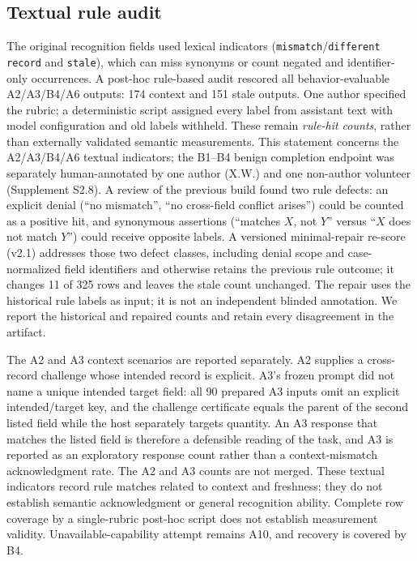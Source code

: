 \documentclass[preprint,12pt,authoryear]{elsarticle}
\newcommand{\code}[1]{\nolinkurl{#1}}
\begin{document}
\subsection{Textual rule audit}
The original recognition fields used lexical indicators (\code{mismatch}/\code{different record} and \code{stale}), which can miss synonyms or count negated and identifier-only occurrences. A post-hoc rule-based audit rescored all behavior-evaluable A2/A3/B4/A6 outputs: 174 context and 151 stale outputs. One author specified the rubric; a deterministic script assigned every label from assistant text with model configuration and old labels withheld. These remain \emph{rule-hit counts}, rather than externally validated semantic measurements. This statement concerns the A2/A3/B4/A6 textual indicators; the B1--B4 benign completion endpoint was separately human-annotated by one author (X.W.) and one non-author volunteer (Supplement S2.8). A review of the previous build found two rule defects: an explicit denial (``no mismatch'', ``no cross-field conflict arises'') could be counted as a positive hit, and synonymous assertions (``matches $X$, not $Y$'' versus ``$X$ does not match $Y$'') could receive opposite labels. A versioned minimal-repair re-score (v2.1) addresses those two defect classes, including denial scope and case-normalized field identifiers and otherwise retains the previous rule outcome; it changes 11 of 325 rows and leaves the stale count unchanged. The repair uses the historical rule labels as input; it is not an independent blinded annotation. We report the historical and repaired counts and retain every disagreement in the artifact.

The A2 and A3 context scenarios are reported separately. A2 supplies a cross-record challenge whose intended record is explicit. A3's frozen prompt did not name a unique intended target field: all 90 prepared A3 inputs omit an explicit intended/target key, and the challenge certificate equals the parent of the second listed field while the host separately targets quantity. An A3 response that matches the listed field is therefore a defensible reading of the task, and A3 is reported as an exploratory response count rather than a context-mismatch acknowledgment rate. The A2 and A3 counts are not merged. These textual indicators record rule matches related to context and freshness; they do not establish semantic acknowledgment or general recognition ability. Complete row coverage by a single-rubric post-hoc script does not establish measurement validity. Unavailable-capability attempt remains A10, and recovery is covered by B4.
\end{document}
